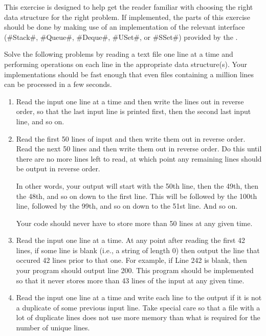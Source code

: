 \begin{exc}
  This exercise is designed to help get the reader familiar with choosing
  the right data structure for the right problem.  If implemented, the
  parts of this exercise should be done by making use of an implementation
  of the relevant interface (#Stack#, #Queue#, #Deque#, #USet#, or #SSet#)
  provided by the .

  Solve the following problems by reading a text file one line at a
  time and performing operations on each line in the appropriate data
  structure(s).  Your implementations should be fast enough that even
  files containing a million lines can be processed in a few seconds.
  \begin{enumerate}
    \item Read the input one line at a time and then write the lines out
      in reverse order, so that the last input line is printed first,
      then the second last input line, and so on.

    \item  Read the first 50 lines of input and then write them out in
      reverse order. Read the next 50 lines and then write them out in
      reverse order. Do this until there are no more lines left to read,
      at which point any remaining lines should be output in reverse
      order.

      In other words, your output will start with the 50th line, then
      the 49th, then the 48th, and so on down to the first line. This
      will be followed by the 100th line, followed by the 99th, and so
      on down to the 51st line. And so on.
      
      Your code should never have to store more than 50 lines at any
      given time.

    \item Read the input one line at a time.
      At any point after reading the first 42 lines, if some line is blank
      (i.e., a string of length 0) then output the line that occured
      42 lines prior to that one. For example, if Line 242 is blank,
      then your program should output line 200. This program should
      be implemented so that it never stores more than 43 lines of the
      input at any given time.

    \item Read the input one line at a time and write each line to the
      output if it is not a duplicate of some previous input line. Take
      special care so that a file with a lot of duplicate lines does not
      use more memory than what is required for the number of unique lines.


\end{enumerate}
\end{exc}
